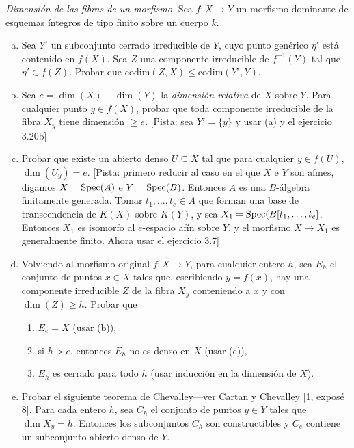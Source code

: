 \documentclass[twoside]{article}
\begin{document}
\newpage

\begin{ejercicio}{3.22}\emph{Dimensión de las fibras de un morfismo.} Sea $f:X\to Y$ un morfismo dominante de esquemas íntegros de tipo finito sobre un cuerpo $k$. 
\begin{enumerate}[(a)]
\item Sea $Y'$ un subconjunto cerrado irreducible de $Y$, cuyo punto genérico $\eta'$ está contenido en $f(X)$. Sea $Z$ una componente irreducible de $f^{-1}(Y)$ tal que $\eta'\in f(Z)$. Probar que $\mathrm{codim}(Z,X)\leq \mathrm{codim}(Y',Y)$. 
\item Sea $e=\dim(X)-\dim(Y)$ la \emph{dimensión relativa} de $X$ sobre $Y$. Para cualquier punto $y\in f(X)$, probar que toda componente irreducible de la fibra $X_y$ tiene dimensión $\geq e$. [Pista: sea $Y'=\overline{\{y\}}$ y usar (a) y el ejercicio 3.20b]
\item Probar que existe un abierto denso $U\subseteq X$ tal que para cualquier $y\in f(U)$, $\dim(U_y)=e$. [Pista: primero reducir al caso en el que $X$ e $Y$ son afines, digamos $X=\operatorname{Spec}(A)$ e $Y=\operatorname{Spec}(B)$. Entonces $A$ es una $B$-álgebra finitamente generada. Tomar $t_1,\dots, t_e\in A$ que forman una base de transcendencia de $K(X)$ sobre $K(Y)$, y sea $X_1=\operatorname{Spec}(B[t_1,\dots, t_e]$. Entonces $X_1$ es isomorfo al $e$-espacio afín sobre $Y$, y el morfismo $X\to X_1$ es generalmente finito. Ahora usar el ejercicio 3.7]
\item Volviendo al morfismo original $f:X\to Y$, para cualquier entero $h$, sea $E_h$ el conjunto de puntos $x\in X$ tales que, escribiendo $y=f(x)$, hay una componente irreducible $Z$ de la fibra $X_y$ conteniendo a $x$ y con $\dim(Z)\geq h$. Probar que
\begin{enumerate}
\item $E_e=X$ (usar (b)),
\item si $h>e$, entonces $E_h$ no es denso en $X$ (usar (c)),
\item $E_h$ es cerrado para todo $h$ (usar inducción en la dimensión de $X$).
\end{enumerate}
\item Probar el siguiente teorema de Chevalley---ver Cartan y Chevalley [1, exposé 8]. Para cada entero $h$, sea $C_h$ el conjunto de puntos $y\in Y$ tales que $\dim X_y=h$. Entonces los subconjuntos $C_h$ son constructibles y $C_e$ contiene un subconjunto abierto denso de $Y$.
\end{enumerate}

\end{ejercicio}
\end{document}
